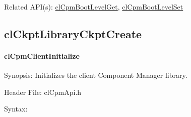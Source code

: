 {\begin{Desc}
\item[Related API(s):]\hyperlink{group__group14}{cl\-Cpm\-Boot\-Level\-Get}, \hyperlink{group__group14}{cl\-Cpm\-Boot\-Level\-Set} \end{Desc}
\newpage




\subsection{clCkptLibraryCkptCreate}
\hypertarget{pagecpm108}{}\paragraph{cl\-Cpm\-Client\-Initialize}\label{pagecpm108}
\begin{Desc}
\item[Synopsis:]Initializes the client Component Manager library.\end{Desc}
\begin{Desc}
\item[Header File:]clCpmApi.h\end{Desc}
\begin{Desc}
\item[Syntax:]


\end{Desc}}
